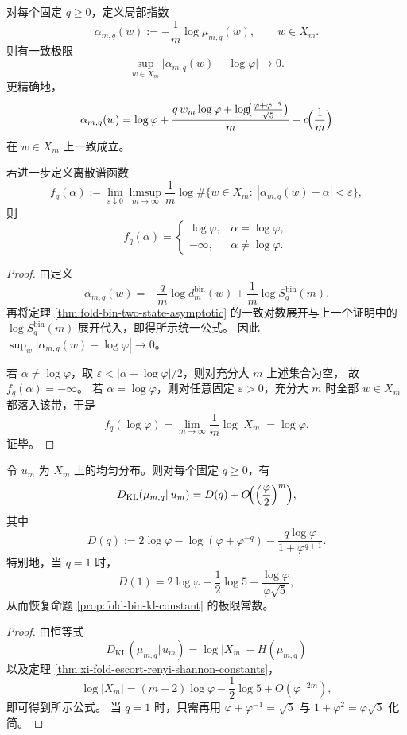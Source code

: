 \begin{theorem}\label{thm:xi-fold-escort-single-point-multifractal-collapse}
对每个固定 \(q\ge 0\)，定义局部指数
\[
\alpha_{m,q}(w):=-\frac{1}{m}\log\mu_{m,q}(w),
\qquad
w\in X_m.
\]
则有一致极限
\[
\sup_{w\in X_m}\bigl|\alpha_{m,q}(w)-\log\varphi\bigr|\longrightarrow 0.
\]
更精确地，
\[
\alpha_{m,q}(w)
=
\log\varphi
+\frac{q\,w_m\log\varphi+\log\!\bigl(\frac{\varphi+\varphi^{-q}}{\sqrt5}\bigr)}{m}
+o\!\Bigl(\frac{1}{m}\Bigr)
\]
在 \(w\in X_m\) 上一致成立。

若进一步定义离散谱函数
\[
f_q(\alpha)
:=
\lim_{\varepsilon\downarrow 0}\limsup_{m\to\infty}
\frac{1}{m}\log
\#\bigl\{w\in X_m:\ |\alpha_{m,q}(w)-\alpha|<\varepsilon\bigr\},
\]
则
\[
f_q(\alpha)=
\begin{cases}
\log\varphi,& \alpha=\log\varphi,\\[1mm]
-\infty,& \alpha\neq \log\varphi.
\end{cases}
\]
\end{theorem}
\begin{proof}
由定义
\[
\alpha_{m,q}(w)=-\frac{q}{m}\log d_m^{\mathrm{bin}}(w)+\frac{1}{m}\log S_q^{\mathrm{bin}}(m).
\]
再将定理 \ref{thm:fold-bin-two-state-asymptotic} 的一致对数展开与上一个证明中的
\(\log S_q^{\mathrm{bin}}(m)\) 展开代入，即得所示统一公式。
因此 \(\sup_{w}|\alpha_{m,q}(w)-\log\varphi|\to 0\)。

若 \(\alpha\neq\log\varphi\)，取 \(\varepsilon<|\alpha-\log\varphi|/2\)，则对充分大 \(m\) 上述集合为空，
故 \(f_q(\alpha)=-\infty\)。
若 \(\alpha=\log\varphi\)，则对任意固定 \(\varepsilon>0\)，充分大 \(m\) 时全部 \(w\in X_m\) 都落入该带，于是
\[
f_q(\log\varphi)=\lim_{m\to\infty}\frac{1}{m}\log|X_m|=\log\varphi.
\]
证毕。
\end{proof}

\begin{corollary}\label{cor:xi-fold-escort-uniform-kl-temperature-law}
令 \(u_m\) 为 \(X_m\) 上的均匀分布。则对每个固定 \(q\ge 0\)，有
\[
D_{\mathrm{KL}}(\mu_{m,q}\Vert u_m)
=
D(q)+O\!\Bigl(\Bigl(\frac{\varphi}{2}\Bigr)^m\Bigr),
\]
其中
\[
D(q)
:=
2\log\varphi-\log(\varphi+\varphi^{-q})
-\frac{q\log\varphi}{1+\varphi^{q+1}}.
\]
特别地，当 \(q=1\) 时，
\[
D(1)=2\log\varphi-\frac12\log 5-\frac{\log\varphi}{\varphi\sqrt5},
\]
从而恢复命题 \ref{prop:fold-bin-kl-constant} 的极限常数。
\end{corollary}
\begin{proof}
由恒等式
\[
D_{\mathrm{KL}}(\mu_{m,q}\Vert u_m)=\log|X_m|-H(\mu_{m,q})
\]
以及定理 \ref{thm:xi-fold-escort-renyi-shannon-constants}，
\[
\log|X_m|=(m+2)\log\varphi-\frac12\log 5+O(\varphi^{-2m}),
\]
即可得到所示公式。
当 \(q=1\) 时，只需再用 \(\varphi+\varphi^{-1}=\sqrt5\) 与 \(1+\varphi^2=\varphi\sqrt5\) 化简。
\end{proof}

